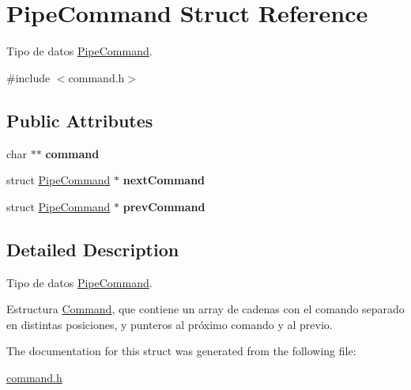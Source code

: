 \hypertarget{structPipeCommand}{\section{Pipe\-Command Struct Reference}
\label{structPipeCommand}
}


Tipo de datos \hyperlink{structPipeCommand}{Pipe\-Command}.  




{\ttfamily \#include $<$command.\-h$>$}

\subsection*{Public Attributes}
\begin{DoxyCompactItemize}
\item 
\hypertarget{structPipeCommand_a469e3e61a46c0614d6aab45c8d9191ba}{char $\ast$$\ast$ {\bfseries command}}\label{structPipeCommand_a469e3e61a46c0614d6aab45c8d9191ba}

\item 
\hypertarget{structPipeCommand_a6bb905aa0dd24685e2dc2b406cef06ee}{struct \hyperlink{structPipeCommand}{Pipe\-Command} $\ast$ {\bfseries next\-Command}}\label{structPipeCommand_a6bb905aa0dd24685e2dc2b406cef06ee}

\item 
\hypertarget{structPipeCommand_a71a98e8e99378fde57c0e1838a5826ec}{struct \hyperlink{structPipeCommand}{Pipe\-Command} $\ast$ {\bfseries prev\-Command}}\label{structPipeCommand_a71a98e8e99378fde57c0e1838a5826ec}

\end{DoxyCompactItemize}


\subsection{Detailed Description}
Tipo de datos \hyperlink{structPipeCommand}{Pipe\-Command}. 

Estructura \hyperlink{structCommand}{Command}, que contiene un array de cadenas con el comando separado en distintas posiciones, y punteros al próximo comando y al previo. 

The documentation for this struct was generated from the following file\-:\begin{DoxyCompactItemize}
\item 
\hyperlink{command_8h}{command.\-h}\end{DoxyCompactItemize}
